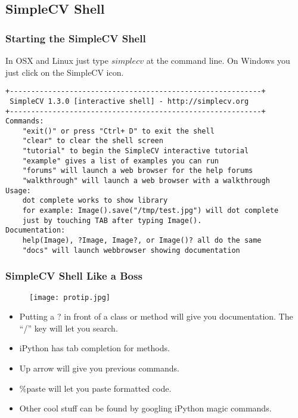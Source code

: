 \documentclass[compress]{beamer}
\begin{document}
\subsection{SimpleCV Shell}
\begin{frame}[fragile] %
\frametitle{Starting the SimpleCV Shell}
In OSX and Linux just type $simplecv$ at the command line. On Windows
you just click on the SimpleCV icon. 
\begin{example}
\begin{verbatim}
+-----------------------------------------------------------+
 SimpleCV 1.3.0 [interactive shell] - http://simplecv.org
+-----------------------------------------------------------+
Commands: 
	"exit()" or press "Ctrl+ D" to exit the shell
	"clear" to clear the shell screen
	"tutorial" to begin the SimpleCV interactive tutorial
	"example" gives a list of examples you can run
	"forums" will launch a web browser for the help forums
	"walkthrough" will launch a web browser with a walkthrough
Usage:
	dot complete works to show library
	for example: Image().save("/tmp/test.jpg") will dot complete
	just by touching TAB after typing Image().
Documentation:
	help(Image), ?Image, Image?, or Image()? all do the same
	"docs" will launch webbrowser showing documentation
\end{verbatim}
\end{example}
\end{frame}
\begin{frame}
\frametitle{SimpleCV Shell Like a Boss}
\begin{figure}
  \texttt{[image: protip.jpg]}
\end{figure}
\begin{itemize}
\item Putting a ? in front of a class or method will give you
  documentation. The ``/'' key will let you search.
\item iPython has tab completion for methods.
\item Up arrow will give you previous commands. 
\item \%paste will let you paste formatted code. 
\item Other cool stuff can be found by googling iPython magic commands.
\end{itemize}
\end{frame}
\end{document}
